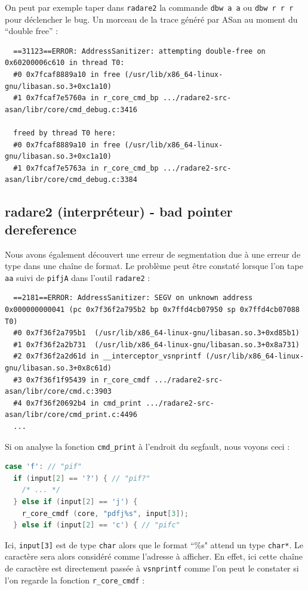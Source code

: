 On peut par exemple taper dans \lstinline{radare2} la commande \lstinline{dbw a a} ou \lstinline{dbw r r r} pour déclencher le bug.
Un morceau de la trace généré par ASan au moment du ``double free'' :
\begin{lstlisting}
  ==31123==ERROR: AddressSanitizer: attempting double-free on 0x60200006c610 in thread T0:
  #0 0x7fcaf8889a10 in free (/usr/lib/x86_64-linux-gnu/libasan.so.3+0xc1a10)
  #1 0x7fcaf7e5760a in r_core_cmd_bp .../radare2-src-asan/libr/core/cmd_debug.c:3416

  freed by thread T0 here:
  #0 0x7fcaf8889a10 in free (/usr/lib/x86_64-linux-gnu/libasan.so.3+0xc1a10)
  #1 0x7fcaf7e5763a in r_core_cmd_bp .../radare2-src-asan/libr/core/cmd_debug.c:3384
\end{lstlisting}

\subsection{radare2 (interpréteur) - bad pointer dereference}

Nous avons également découvert une erreur de segmentation due à une erreur de type dans une chaîne de format.
Le problème peut être constaté lorsque l'on tape \lstinline{aa} suivi de \lstinline{pifjA} dans l'outil \lstinline{radare2} :

\begin{lstlisting}
  ==2181==ERROR: AddressSanitizer: SEGV on unknown address 0x000000000041 (pc 0x7f36f2a795b2 bp 0x7ffd4cb07950 sp 0x7ffd4cb07088 T0)
  #0 0x7f36f2a795b1  (/usr/lib/x86_64-linux-gnu/libasan.so.3+0xd85b1)
  #1 0x7f36f2a2b731  (/usr/lib/x86_64-linux-gnu/libasan.so.3+0x8a731)
  #2 0x7f36f2a2d61d in __interceptor_vsnprintf (/usr/lib/x86_64-linux-gnu/libasan.so.3+0x8c61d)
  #3 0x7f36f1f95439 in r_core_cmdf .../radare2-src-asan/libr/core/cmd.c:3903
  #4 0x7f36f20692b4 in cmd_print .../radare2-src-asan/libr/core/cmd_print.c:4496
  ...
\end{lstlisting}

Si on analyse la fonction \lstinline{cmd_print} à l'endroit du segfault, nous voyons ceci :

\begin{lstlisting}[language=C]
case 'f': // "pif"
  if (input[2] == '?') { // "pif?"
    /* ... */
  } else if (input[2] == 'j') {
    r_core_cmdf (core, "pdfj%s", input[3]);
  } else if (input[2] == 'c') { // "pifc"
\end{lstlisting}

Ici, \lstinline{input[3]} est de type \lstinline{char} alors que le format ``\%s" attend un type \lstinline{char*}.
Le caractère sera alors considéré comme l'adresse à afficher.
En effet, ici cette chaîne de caractère est directement passée à \lstinline{vsnprintf} comme l'on peut le constater si l'on regarde la fonction \lstinline{r_core_cmdf} :

